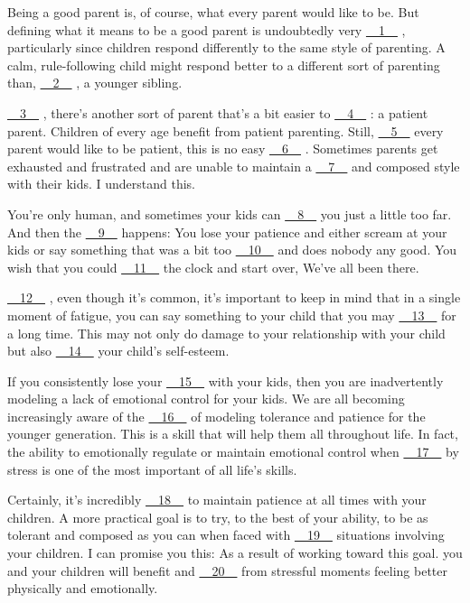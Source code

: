 Being a good parent is, of course, what every parent would like to be. But defining what it means to be a good parent is undoubtedly very \uline{~~1~~} , particularly since children respond differently to the same style of parenting. A calm, rule-following child might respond better to a different sort of parenting than, \uline{~~2~~} , a younger sibling.


\uline{~~3~~} , there's another sort of parent that's a bit easier to \uline{~~4~~} : a patient parent. Children of every age benefit from patient parenting. Still, \uline{~~5~~} every parent would like to be patient, this is no easy \uline{~~6~~} . Sometimes parents get exhausted and frustrated and are unable to maintain a \uline{~~7~~} and composed style with their kids. I understand this.


You're only human, and sometimes your kids can \uline{~~8~~} you just a little too far. And then the \uline{~~9~~} happens: You lose your patience and either scream at your kids or say something that was a bit too \uline{~~10~~} and does nobody any good. You wish that you could \uline{~~11~~} the clock and start over, We've all been there.


\uline{~~12~~} , even though it's common, it's important to keep in mind that in a single moment of fatigue, you can say something to your child that you may \uline{~~13~~} for a long time. This may not only do damage to your relationship with your child but also \uline{~~14~~} your child's self-esteem.


If you consistently lose your \uline{~~15~~} with your kids, then you are inadvertently modeling a lack of emotional control for your kids. We are all becoming increasingly aware of the \uline{~~16~~} of modeling tolerance and patience for the younger generation. This is a skill that will help them all throughout life. In fact, the ability to emotionally regulate or maintain emotional control when \uline{~~17~~} by stress is one of the most important of all life's skills.


Certainly, it's incredibly \uline{~~18~~} to maintain patience at all times with your children. A more practical goal is to try, to the best of your ability, to be as tolerant and composed as you can when faced with \uline{~~19~~} situations involving your children. I can promise you this: As a result of working toward this goal. you and your children will benefit and \uline{~~20~~} from stressful moments feeling better physically and emotionally.
